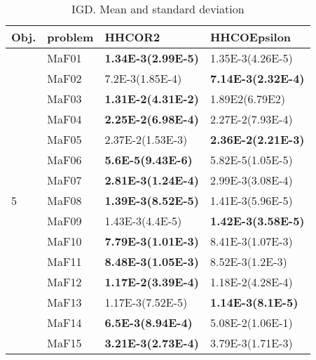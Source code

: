 \documentclass[]{article}
\begin{document}
\begin{table}
\caption{IGD. Mean and standard deviation}
\label{table:mean.IGD}
\centering
\begin{footnotesize}
\begin{tabular}{|l|l|l|l|}
\hline
Obj. & problem  & HHCOR2 & HHCOEpsilon \\ \hline

\multirow{15}{*}{5} & MaF01 & \cellcolor{gray95} {\bf 1.34E-3(2.99E-5)} & \cellcolor{gray95} 1.35E-3(4.26E-5)\\
 & MaF02 & \cellcolor{gray95} 7.2E-3(1.85E-4) & \cellcolor{gray95} {\bf 7.14E-3(2.32E-4)}\\
 & MaF03 & \cellcolor{gray95} {\bf 1.31E-2(4.31E-2)} & \cellcolor{gray95} 1.89E2(6.79E2)\\
 & MaF04 & \cellcolor{gray95} {\bf 2.25E-2(6.98E-4)} & \cellcolor{gray95} 2.27E-2(7.93E-4)\\
 & MaF05 & \cellcolor{gray95} 2.37E-2(1.53E-3) & \cellcolor{gray95} {\bf 2.36E-2(2.21E-3)}\\
 & MaF06 & \cellcolor{gray95} {\bf 5.6E-5(9.43E-6)} & \cellcolor{gray95} 5.82E-5(1.05E-5)\\
 & MaF07 & \cellcolor{gray95} {\bf 2.81E-3(1.24E-4)} & 2.99E-3(3.08E-4)\\
 & MaF08 & \cellcolor{gray95} {\bf 1.39E-3(8.52E-5)} & \cellcolor{gray95} 1.41E-3(5.96E-5)\\
 & MaF09 & \cellcolor{gray95} 1.43E-3(4.4E-5) & \cellcolor{gray95} {\bf 1.42E-3(3.58E-5)}\\
 & MaF10 & \cellcolor{gray95} {\bf 7.79E-3(1.01E-3)} & 8.41E-3(1.07E-3)\\
 & MaF11 & \cellcolor{gray95} {\bf 8.48E-3(1.05E-3)} & \cellcolor{gray95} 8.52E-3(1.2E-3)\\
 & MaF12 & \cellcolor{gray95} {\bf 1.17E-2(3.39E-4)} & \cellcolor{gray95} 1.18E-2(4.28E-4)\\
 & MaF13 & \cellcolor{gray95} 1.17E-3(7.52E-5) & \cellcolor{gray95} {\bf 1.14E-3(8.1E-5)}\\
 & MaF14 & \cellcolor{gray95} {\bf 6.5E-3(8.94E-4)} & \cellcolor{gray95} 5.08E-2(1.06E-1)\\
 & MaF15 & \cellcolor{gray95} {\bf 3.21E-3(2.73E-4)} & \cellcolor{gray95} 3.79E-3(1.71E-3)\\
\hline


\end{tabular}
\end{footnotesize}
\end{table}
\end{document}
